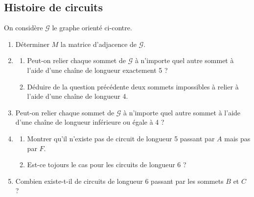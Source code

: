\documentclass[oneside,12pt]{book}          %
\begin{document}
\subsection{Histoire de circuits}
\begin{minipage}{0.68\linewidth}
On considère $\mathcal{G}$ le graphe orienté ci-contre.
\begin{enumerate}
    \item Déterminer $M$ la matrice d'adjacence de $\mathcal{G}$.
    \item  \begin{enumerate}
        \item Peut-on relier chaque sommet de $\mathcal{G}$ à n'importe quel autre sommet à l'aide d'une chaîne de longueur exactement 5 ?
        \item Déduire de la question précédente deux sommets impossibles à relier à l'aide d'une chaîne de longueur 4.
    \end{enumerate}
    \item Peut-on relier chaque sommet de $\mathcal{G}$ à n'importe quel autre sommet à l'aide d'une chaîne de longueur inférieure ou égale à 4 ?
    \item \begin{enumerate}
        \item Montrer qu'il n'existe pas de circuit de longueur 5 passant par $A$  mais pas par $F$.
        \item Est-ce tojours le cas pour les circuits de longueur 6 ?
    \end{enumerate}
    \item Combien existe-t-il de circuits de longueur 6 passant par les sommets $B$ et $C$ ?
\end{enumerate}
\end{minipage}\hspace{5mm}
\begin{minipage}{0.35\linewidth}
\end{minipage}
\end{document}
